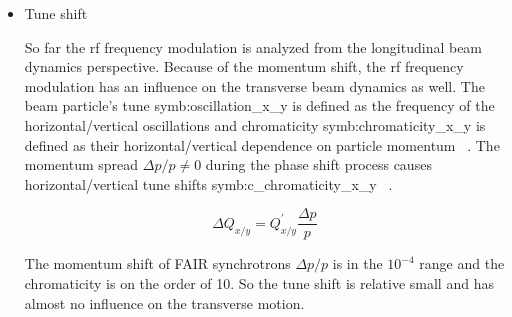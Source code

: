 \begin{itemize}
	\item Tune shift

So far the rf frequency modulation is analyzed from the longitudinal beam dynamics perspective. Because of the momentum shift, the rf frequency modulation has an influence on the transverse beam dynamics as well. The beam particle’s tune \gls{symb:oscillation_x_y} is defined as the frequency of the horizontal/vertical oscillations and chromaticity \gls{symb:chromaticity_x_y} is defined as their horizontal/vertical dependence on particle momentum ~\cite{steinhagen_tune_2008}. The momentum spread ${\Delta{p}}/{p} \neq 0$ during the phase shift process causes horizontal/vertical tune shifts \gls{symb:c_chromaticity_x_y} ~\cite{holzer_introduction_2013}.

\begin{equation}
\Delta{Q_{\mathit{x/y}}} = Q^\prime_{\mathit{x/y}}\frac{\Delta{p}}{p}
\label{eq:chromaticity_x}
\end{equation} 

The momentum shift of FAIR synchrotrons $\Delta p/p$ is in the $10^{-4}$ range and the chromaticity is on the order of \SI{10}{}. So the tune shift is relative small and has almost no influence on the transverse motion.

\end{itemize}

